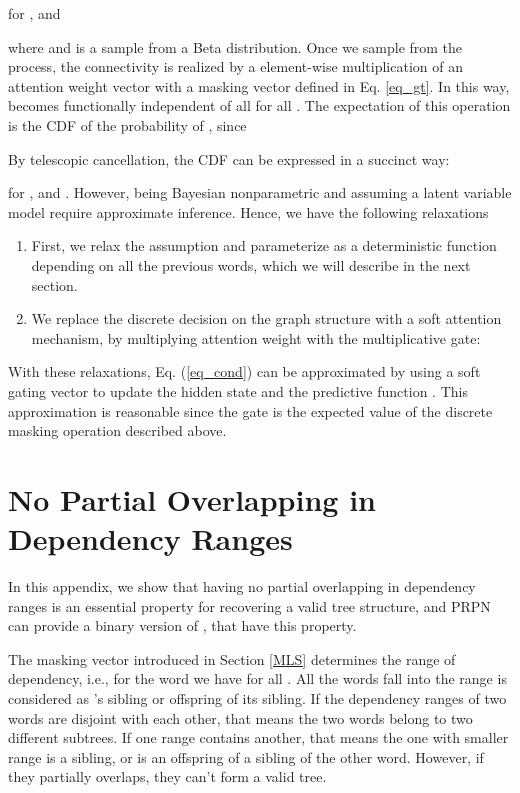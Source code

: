 \documentclass{article} \usepackage{iclr2018_conference,times}
\begin{document}
for , and 

where  and  is a sample from a Beta distribution. 
Once we sample  from the process, the connectivity is realized by a element-wise multiplication of an attention weight vector with a masking vector  defined in Eq. \ref{eq_gt}.
In this way,  becomes functionally independent of all  for all .
The expectation of this operation is the CDF of the probability of , since 






By telescopic cancellation, the CDF can be expressed in a succinct way: 



for , and .
However, being Bayesian nonparametric and assuming a latent variable model require approximate inference. 
Hence, we have the following relaxations

\begin{enumerate}
	\item First, we relax the assumption and parameterize  as a deterministic function depending on all the previous words, which we will describe in the next section. 
	\item We replace the discrete decision on the graph structure with a soft attention mechanism, by multiplying attention weight with the multiplicative gate:
    
\end{enumerate}

With these relaxations, Eq. (\ref{eq_cond}) can be approximated by using a soft gating vector to update the hidden state  and the predictive function . This approximation is reasonable since the gate is the expected value of the discrete masking operation described above.


\section{No Partial Overlapping in Dependency Ranges} \label{appendix_overlap}
In this appendix, we show that having no partial overlapping in dependency ranges is an essential property for recovering a valid tree structure, and PRPN can provide a binary version of , that have this property.

The masking vector  introduced in Section \ref{MLS} determines the range of dependency, i.e., for the word  we have  for all . All the words fall into the range  is considered as 's sibling or offspring of its sibling. If the dependency ranges of two words are disjoint with each other, that means the two words belong to two different subtrees. If one range contains another, that means the one with smaller range is a sibling, or is an offspring of a sibling of the other word. However, if they partially overlaps, they can't form a valid tree. 
\end{document}
